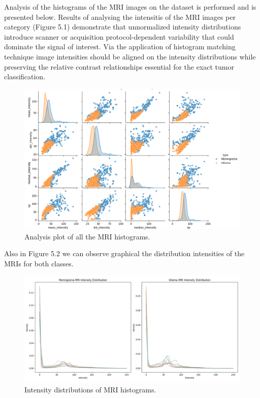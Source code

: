 \documentclass[11pt,a4paper]{article}
\begin{document}
Analysis of the histograms of the MRI images on the dataset is performed
and is presented below. Results of analysing the intensitis of the 
MRI images per category (Figure 5.1)
demonstrate that unnormalized intensity distributions introduce scanner 
or acquisition protocol-dependent variability that
could dominate the signal of interest. 
Via the application of histogram matching technique image 
intensities should be aligned on the intensity distributions 
while preserving the relative contrast relationships 
essential for the exact tumor classification.

		\begin{figure}[H]
			\centering
			\includegraphics[width=1.0\textwidth]{images/histogram_analysis_unmatched.png}
			\caption{Analysis plot of all the MRI histograms.}
			\label{fig1:}
		\end{figure}		


Also in Figure 5.2 we can observe graphical the distribution intensities of the MRIs for both classes.
		\begin{figure}[H]
			\centering
			\includegraphics[width=1.0\textwidth]{images/Unmatched_intensity_distributions.png}
			\caption{Intensity distributions of MRI histograms.}
			\label{fig1:}
		\end{figure}		
\end{document}
